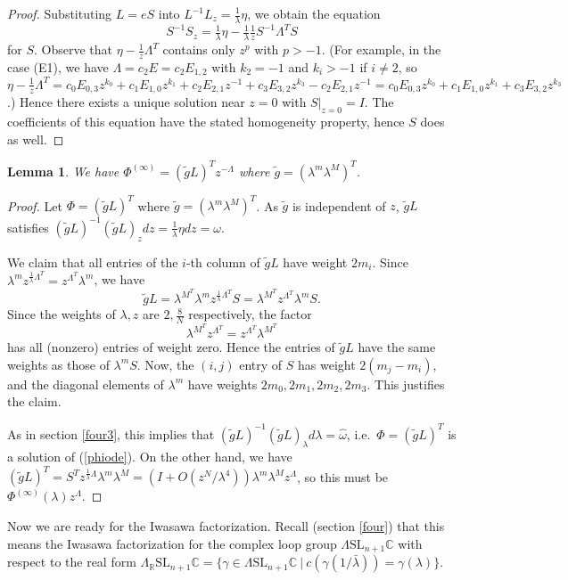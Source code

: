 \documentclass[a4paper,12pt,leqno]{amsart}
\numberwithin{equation}{section}
\theoremstyle{plain}
\newtheorem{lemma}[theorem]{Lemma}
\theoremstyle{definition}
\newcommand{\C}{\mathbb C}
\newcommand{\R}{\mathbb R}
\newcommand{\ga}{\gamma}
\newcommand{\la}{\lambda}
\newcommand{\La}{\Lambda}
\newcommand{\om}{\omega}
\newcommand{\SL}{\textrm{SL}}
\newcommand{\st}{\ \vert\ }
\newcommand{\Phii}{\Phi^{(\infty)}}
\newcommand{\nn}{m}
\newcommand{\NN}{M}
\newcommand{\MM}{\Lambda}
\begin{document}
{\begin{proof}  Substituting $L=eS$ into $L^{-1}L_z = \tfrac1\la \eta$, we obtain the equation 
\[
S^{-1}S_z = \tfrac1\la \eta -  \tfrac1\la  \tfrac1z S^{-1} \MM^T S
\]
for $S$.  
Observe
that $\eta-\tfrac1z\MM^T$ contains only $z^p$ with $p>-1$. 
(For example, in the case (E1),
we have $\MM=c_2E=c_2 E_{1,2}$ with $k_2=-1$ and $k_i>-1$ if $i\ne 2$, so
$\eta -  \tfrac1z  \MM^T  = c_0 E_{0,3}z^{k_0} + c_1E_{1,0} z^{k_1} + c_2E_{2,1} z^{-1} +c_3E_{3,2} z^{k_3} - c_2E_{2,1} z^{-1} = c_0 E_{0,3}z^{k_0} + c_1E_{1,0} z^{k_1} +c_3E_{3,2} z^{k_3}$.)
Hence there exists a unique solution near $z=0$
with $S\vert_{z=0}=I$.  The coefficients of this equation have the stated homogeneity property, hence $S$ does as well.  
\end{proof}

\begin{lemma}\label{gtildeL}
We have $\Phii = (\tilde g L)^T z^{-\MM}$ where $\tilde g=(\la^\nn\la^\NN)^T$.\end{lemma}

\begin{proof} 
Let $\Phi=(\tilde g L)^T$ where
$\tilde g=(\la^\nn\la^\NN)^T$. 
As $\tilde g$ is independent of $z$, $\tilde g L$ satisfies 
$(\tilde g L)^{-1}(\tilde gL)_z dz  = \tfrac1\la\eta dz = \om$. 

We claim that all entries of the $i$-th column of $\tilde g L$ have weight $2\nn_i$.  
Since $\la^\nn z^{\frac1\la \MM^T} = z^{\MM^T}\la^\nn$, we have
\[
\tilde g L = \la^{\NN^T} \la^\nn z^{\frac1\la \MM^T}  S = \la^{\NN^T}  z^{\MM^T}  \la^\nn S.
\]
Since the weights of $\la,z$ are $2,\tfrac 8N$ respectively, the factor
\[
 \la^{\NN^T}  z^{\MM^T}
 = z^{\MM^T}  \la^{\NN^T} 
\]
has all (nonzero) entries of weight zero.  Hence the entries of $\tilde g L$ have the same weights as those of $\la^\nn S$.  Now, the  $(i,j)$ entry of $S$ has weight $2(\nn_j-\nn_i)$, and the diagonal elements of $\la^\nn$ have weights $2\nn_0,2\nn_1,2\nn_2,2\nn_3$.  This justifies the claim. 

As in section \ref{four3}, this implies that 
$(\tilde g L)^{-1}(\tilde gL)_\la d\la = \hat\om$, i.e.\ $\Phi=(\tilde g L)^T$ is a solution of (\ref{phiode}).  On the other hand, we have
$(\tilde g L)^T=S^T  z^{\frac1\la \MM} \la^\nn \la^\NN = (I+O(z^N/\la^4)) \la^\nn \la^\NN z^\MM$,
so this must be $\Phii(\la) z^\MM$.
\end{proof}

Now we are ready for the Iwasawa factorization.
Recall (section \ref{four}) that this means the Iwasawa factorization for the complex loop group
$\La \SL_{n+1}\C$
with respect to the real form 
$\La_\R \SL_{n+1}\C = \{ \ga\in \La \SL_{n+1}\C \st  c(\ga(1/{\bar\la})) = \ga(\la)\}$. 

}
\end{document}
